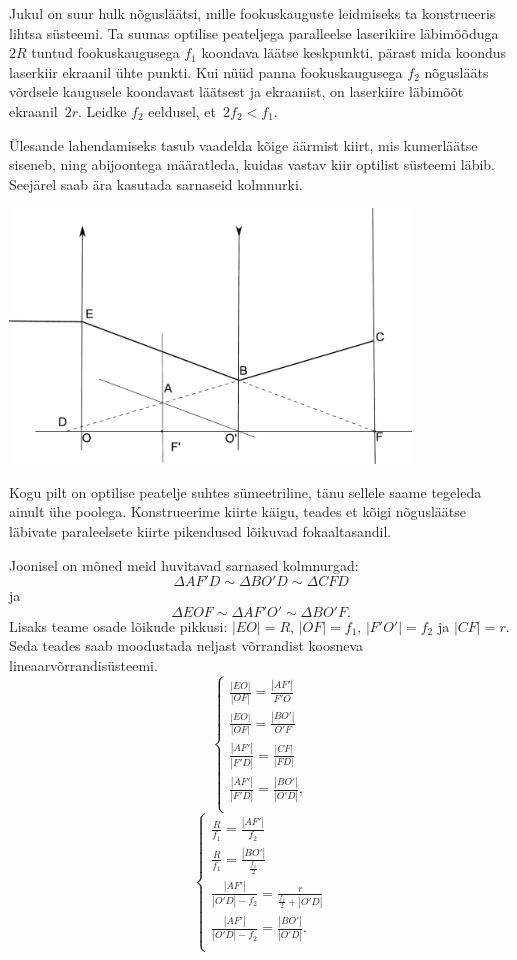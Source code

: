 
Jukul on suur hulk nõgusläätsi, mille fookuskauguste leidmiseks ta konstrueeris lihtsa
süsteemi. Ta suunas optilise peateljega paralleelse
laserikiire läbimõõduga $2R$ tuntud fookuskaugusega
$f_1$ koondava läätse keskpunkti, pärast mida koondus laserkiir ekraanil ühte punkti. Kui nüüd panna
fookuskaugusega $f_2$ nõguslääts võrdsele kaugusele koondavast läätsest ja
ekraanist, on laserkiire läbimõõt ekraanil~$2r$. Leidke $f_2$ eeldusel, et~$2f_2 < f_1$.

\hint
Ülesande lahendamiseks tasub vaadelda kõige äärmist kiirt, mis kumerläätse siseneb, ning abijoontega määratleda, kuidas vastav kiir optilist süsteemi läbib. Seejärel saab ära kasutada sarnaseid kolmnurki.

\solu
\begin{center}
	\includegraphics[width=0.8\textwidth]{2013-v3g-01-laats_lah2}\\
\end{center}
Kogu pilt on optilise peatelje suhtes sümeetriline, tänu sellele saame tegeleda ainult ühe poolega. Konstrueerime kiirte käigu, teades et kõigi nõgusläätse läbivate paraleelsete kiirte pikendused lõikuvad fokaaltasandil. 

Joonisel on mõned meid huvitavad sarnased kolmnurgad: $$\Delta AF'D \sim \Delta BO'D \sim \Delta CFD$$ ja $$\Delta EOF \sim \Delta AF'O' \sim \Delta BO'F.$$ Lisaks teame osade lõikude pikkusi: $|EO| = R$, $|OF| = f_1$, $|F'O'| = f_2$ ja $|CF| = r$.
Seda teades saab moodustada neljast võrrandist koosneva lineaarvõrrandisüsteemi.
\[ 
\begin{cases}
\frac{|EO|}{|OF|} = \frac{|AF'|}{F'O}\\
\frac{|EO|}{|OF|} = \frac{|BO'|}{O'F}\\
\frac{|AF'|}{|F'D|} = \frac{|CF|}{|FD|}\\
\frac{|AF'|}{|F'D|} = \frac{|BO'|}{|O'D|},\\
\end{cases}
\]
\[ 
\begin{cases}
\frac{R}{f_1} = \frac{|AF'|}{f_2}\\
\frac{R}{f_1} = \frac{|BO'|}{\frac{f_1}{2}}\\
\frac{|AF'|}{|O'D| - f_2} = \frac{r}{\frac{f_1}{2} + |O'D|}\\
\frac{|AF'|}{|O'D| - f_2} = \frac{|BO'|}{|O'D|}.\\
\end{cases}
\]

